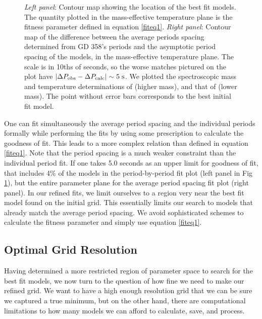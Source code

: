 \documentclass[12pt,preprint]{aastex}
\begin{document}
\begin{figure}
\caption{
{\it Left panel}: Contour map showing the location of the best fit models. The quantity plotted in 
the mass-effective temperature plane is the fitness parameter defined in equation \ref{fiteq1}. 
{\it Right panel}: Contour map of the difference between the average 
periods spacing determined from GD 358's periods and the asymptotic period spacing of the models, 
in the mass-effective temperature plane. The scale is in 10ths of seconds, so the worse matches 
pictured on the plot have $\left|\Delta P_{\rm obs}- \Delta P_{\rm calc}\right| \sim 5 \; \rm s$. 
We plotted the spectroscopic mass and temperature determinations of \citet{Bergeron2011} (higher mass), 
and that of \citet{Koester2013} (lower mass). The point without error bars corresponds to the 
best initial fit model. \label{ffit2}
}
\end{figure}

One can fit simultaneously the average period spacing and the individual periods 
formally while performing the fits by using some prescription to calculate the goodness of fit. 
This leads to a more complex relation than defined in equation \ref{fiteq1}. 
Note that the period spacing is a much weaker constraint than the individual period fit. 
If one takes 5.0 seconds as an upper limit for goodness of fit, that includes 4\% of the models in the 
period-by-period fit plot (left panel in Fig \ref{ffit2}), but the entire parameter plane 
for the average period spacing fit plot (right panel). In our refined fits, we limit ourselves to a 
region very near the best fit model found on the initial grid. This essentially limits our search 
to models that already match the average period spacing. We avoid sophisticated schemes to calculate 
the fitness parameter and simply use equation \ref{fiteq1}.


\subsection{Optimal Grid Resolution}
\label{refinedfits}


Having determined a more restricted region of parameter space to search for 
the best fit models, we now turn to the question of how fine we need to 
make our refined grid. We want to have a high enough resolution grid that 
we can be sure we captured a true minimum, but on the other hand, there are 
computational limitations to how many models we can afford to calculate, 
save, and process.
\end{document}
